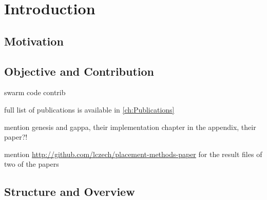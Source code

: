 
\chapter{Introduction}
\label{ch:Introduction}



\section{Motivation}
\label{ch:Introduction:sec:Motivation}


\section{Objective and Contribution}
\label{ch:Introduction:sec:ObjectiveContribution}

swarm code contrib \cite{Mahe2014,Mahe2015}

full list of publications is available in \ref{ch:Publications}

mention genesis and gappa, their implementation chapter in the appendix,
their paper?!

mention  \url{http://github.com/lczech/placement-methods-paper} for the result files of two of the papers


\section{Structure and Overview}
\label{ch:Introduction:sec:StructureOverview}
